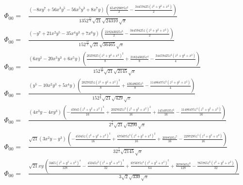 \documentclass[10pt]{article}
\begin{document}
\begin{align*}
\Phi_{00} = &\frac{\left( -8 x {{y}^{7}}+56 {{x}^{3}} {{y}^{5}}-56 {{x}^{5}} {{y}^{3}}+8 {{x}^{7}} y\right) \, \left( \frac{654729075 {{z}^{2}}}{2}-\frac{34459425 \left( {{z}^{2}}+{{y}^{2}}+{{x}^{2}}\right) }{2}\right) }{135 {{2}^{\frac{15}{2}}} \sqrt{21} \sqrt{24310} \sqrt{\ensuremath{\pi} }} \\
\Phi_{00} = &\frac{\left( -{{y}^{7}}+21 {{x}^{2}} {{y}^{5}}-35 {{x}^{4}} {{y}^{3}}+7 {{x}^{6}} y\right) \, \left( \frac{218243025 {{z}^{3}}}{2}-\frac{34459425 z\, \left( {{z}^{2}}+{{y}^{2}}+{{x}^{2}}\right) }{2}\right) }{15 {{2}^{\frac{15}{2}}} \sqrt{21} \sqrt{36465} \sqrt{\ensuremath{\pi} }} \\
\Phi_{00} = &\frac{\left( 6 x {{y}^{5}}-20 {{x}^{3}} {{y}^{3}}+6 {{x}^{5}} y\right) \, \left( \frac{2027025 {{\left( {{z}^{2}}+{{y}^{2}}+{{x}^{2}}\right) }^{2}}}{8}+\frac{218243025 {{z}^{4}}}{8}-\frac{34459425 {{z}^{2}} \left( {{z}^{2}}+{{y}^{2}}+{{x}^{2}}\right) }{4}\right) }{15 {{2}^{\frac{13}{2}}} \sqrt{21} \sqrt{2145} \sqrt{\ensuremath{\pi} }} \\
\Phi_{00} = &\frac{\left( {{y}^{5}}-10 {{x}^{2}} {{y}^{3}}+5 {{x}^{4}} y\right) \, \left( \frac{2027025 z {{\left( {{z}^{2}}+{{y}^{2}}+{{x}^{2}}\right) }^{2}}}{8}+\frac{43648605 {{z}^{5}}}{8}-\frac{11486475 {{z}^{3}} \left( {{z}^{2}}+{{y}^{2}}+{{x}^{2}}\right) }{4}\right) }{15 {{2}^{\frac{9}{2}}} \sqrt{21} \sqrt{429} \sqrt{\ensuremath{\pi} }} \\
\Phi_{00} = &\frac{\left( 4 {{x}^{3}} y-4 x {{y}^{3}}\right) \, \left( -\frac{45045 {{\left( {{z}^{2}}+{{y}^{2}}+{{x}^{2}}\right) }^{3}}}{16}+\frac{2027025 {{z}^{2}} {{\left( {{z}^{2}}+{{y}^{2}}+{{x}^{2}}\right) }^{2}}}{16}+\frac{14549535 {{z}^{6}}}{16}-\frac{11486475 {{z}^{4}} \left( {{z}^{2}}+{{y}^{2}}+{{x}^{2}}\right) }{16}\right) }{{{2}^{\frac{7}{2}}} \sqrt{21} \sqrt{4290} \sqrt{\ensuremath{\pi} }} \\
\Phi_{00} = &\frac{\sqrt{21} \left( 3 {{x}^{2}} y-{{y}^{3}}\right) \, \left( -\frac{45045 z {{\left( {{z}^{2}}+{{y}^{2}}+{{x}^{2}}\right) }^{3}}}{16}+\frac{675675 {{z}^{3}} {{\left( {{z}^{2}}+{{y}^{2}}+{{x}^{2}}\right) }^{2}}}{16}+\frac{2078505 {{z}^{7}}}{16}-\frac{2297295 {{z}^{5}} \left( {{z}^{2}}+{{y}^{2}}+{{x}^{2}}\right) }{16}\right) }{3 {{2}^{\frac{7}{2}}} \sqrt{2145} \sqrt{\ensuremath{\pi} }} \\
\Phi_{00} = &\frac{\sqrt{21} x y\, \left( \frac{3465 {{\left( {{z}^{2}}+{{y}^{2}}+{{x}^{2}}\right) }^{4}}}{128}-\frac{45045 {{z}^{2}} {{\left( {{z}^{2}}+{{y}^{2}}+{{x}^{2}}\right) }^{3}}}{32}+\frac{675675 {{z}^{4}} {{\left( {{z}^{2}}+{{y}^{2}}+{{x}^{2}}\right) }^{2}}}{64}+\frac{2078505 {{z}^{8}}}{128}-\frac{765765 {{z}^{6}} \left( {{z}^{2}}+{{y}^{2}}+{{x}^{2}}\right) }{32}\right) }{3 \sqrt{2} \sqrt{330} \sqrt{\ensuremath{\pi} }} \\

\end{align*}
\end{document}
